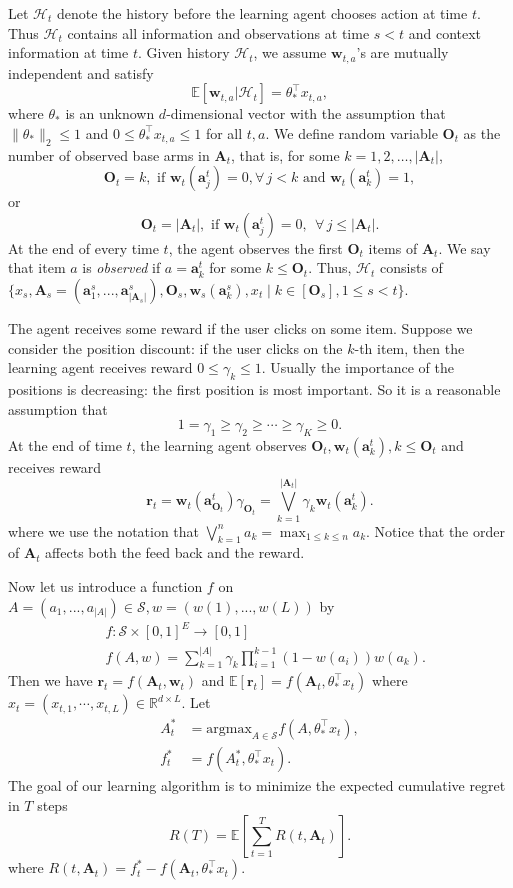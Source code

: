 \documentclass{article}
\newcommand{\EE}{\mathbb{E}}
\newcommand{\RR}{\mathbb{R}}
\newcommand{\bA}{\mathbf{A}}
\newcommand{\ba}{\mathbf{a}}
\newcommand{\bO}{\mathbf{O}}
\newcommand{\br}{\mathbf{r}}
\newcommand{\bw}{\mathbf{w}}
\newcommand{\cH}{\mathcal{H}}
\newcommand{\cS}{\mathcal{S}}
\newcommand{\argmax}{\mathrm{argmax}}
\newcommand{\abs}[1]{\left| #1 \right|}
\newcommand{\norm}[1]{\| #1 \|}
\begin{document}
Let $\cH_t$ denote the history before the learning agent chooses action at time $t$.
Thus $\cH_t$ contains all information and observations at time $s < t$ and context information at time $t$. Given history $\cH_t$, we assume $\bw_{t,a}$'s are mutually independent and satisfy
\begin{equation}
\label{eq:expectation}
\EE[\bw_{t,a} | \cH_t] = \theta_{\ast}^{\top} x_{t,a},
\end{equation}
where $\theta_{\ast}$ is an unknown $d$-dimensional vector with the assumption that $\norm{\theta_{\ast}}_2 \leq 1$ and $0 \leq \theta_{\ast}^{\top} x_{t,a} \leq 1$ for all $t, a$. 
We define random variable $\bO_t$ as the number of observed base arms in $\bA_t$, that is,
	for some $k=1,2,\ldots, \abs{\bA_t}$, 
$$
\bO_t = k, \text{ if } \bw_t(\ba_j^t)=0, \forall\, j < k \text{ and } \bw_t(\ba_k^t) = 1,
$$
or 
$$
\bO_t = \abs{\bA_t}, \text{ if }\bw_t(\ba_j^t) = 0, ~~ \forall\, j \leq \abs{\bA_t}.
$$
At the end of every time $t$, the agent observes the first $\bO_t$ items of $\bA_t$. We say that item $a$ is {\it observed} if $a = \ba_k^t$ for some $k \leq \bO_t$. 
Thus, $\cH_t$ consists of $\{x_s, \bA_s = (\ba_{1}^s,...,\ba_{\abs{\bA_s}}^s), \bO_s, \bw_s(\ba_k^s),x_t 
	\mid  k \in[\bO_s], 1 \le s<t \}$.

The agent receives some reward if the user clicks on some item. Suppose we consider the position discount: if the user clicks on the $k$-th item, then the learning agent receives reward $0 \leq \gamma_k \leq 1$. Usually the importance of the positions is decreasing: the first position is most important. So it is a reasonable assumption that
$$
1 = \gamma_1 \geq \gamma_2 \geq \cdots \geq \gamma_K \geq 0.
$$
At the end of time $t$, the learning agent observes $\bO_t, \bw_t(\ba_k^t), k \leq \bO_t$ and receives reward
$$
\br_t = \bw_t(\ba_{\bO_t}^t) \gamma_{\bO_t} = \bigvee_{k=1}^{\abs{\bA_t}} \gamma_k \bw_t(\ba_k^t).
$$
where we use the notation that $\bigvee_{k=1}^n a_k = \max_{1 \leq k \leq n} a_k$. Notice that the order of $\bA_t$ affects both the feed back and the reward.

Now let us introduce a function $f$ on $A = (a_1,...,a_{\abs{A}}) \in \cS, w = (w(1),...,w(L))$ by
\begin{align*}
&f : \cS \times [0,1]^E \to [0,1]\\
&f(A,w) = \sum_{k = 1}^{\abs{A}} \gamma_{k} \prod_{i=1}^{k-1} (1 - w(a_i)) w(a_k).
\end{align*}
Then we have $\br_t = f(\bA_t, \bw_t)$ and $\EE[\br_t] = f(\bA_t, \theta_{\ast}^{\top}x_t)$ where $x_t = (x_{t,1}, \cdots, x_{t,L}) \in \RR^{d \times L}$. Let 
\begin{align*}
A_t^{\ast} &= \argmax_{A\in \cS} f(A,\theta_{\ast}^{\top}x_t),\\
f_t^{\ast} &= f(A_t^{\ast}, \theta_{\ast}^{\top}x_t).
\end{align*}
The goal of our learning algorithm is to minimize the expected cumulative regret in $T$ steps
$$
R(T) = \EE[\sum_{t=1}^T R(t, \bA_t)].
$$
where $R(t, \bA_t) = f_t^{\ast} - f(\bA_t, \theta_{\ast}^{\top}x_t)$.
\end{document}
